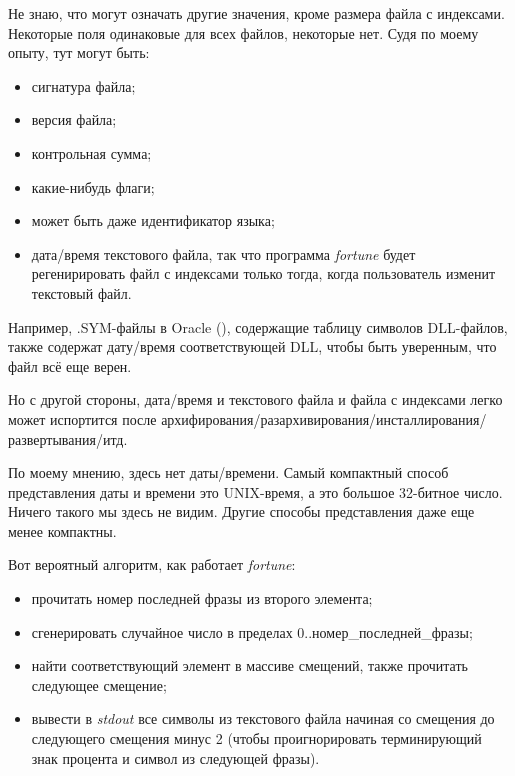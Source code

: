 \begin{figure}[H]
\centering
{}
\end{figure}

Не знаю, что могут означать другие значения, кроме размера файла с индексами.
Некоторые поля одинаковые для всех файлов, некоторые нет.
Судя по моему опыту, тут могут быть:

\begin{itemize}
\item сигнатура файла;
\item версия файла;
\item контрольная сумма;
\item какие-нибудь флаги;
\item может быть даже идентификатор языка;
\item дата/время текстового файла, так что программа \emph{fortune} будет регенирировать файл с индексами только тогда, когда
пользователь изменит текстовый файл.
\end{itemize}

Например, .SYM-файлы в Oracle (), содержащие таблицу символов DLL-файлов,
также содержат дату/время соответствующей DLL, чтобы быть уверенным, что файл всё еще верен.

Но с другой стороны, дата/время и текстового файла и файла с индексами легко может испортится после
архифирования/разархивирования/инсталлирования/развертывания/итд.

По моему мнению, здесь нет даты/времени. Самый компактный способ представления даты и времени это UNIX-время,
а это большое 32-битное число. Ничего такого мы здесь не видим. Другие способы представления даже еще менее компактны.

Вот вероятный алгоритм, как работает \emph{fortune}:

\begin{itemize}
\item прочитать номер последней фразы из второго элемента;
\item сгенерировать случайное число в пределах 0..номер\_последней\_фразы;
\item найти соответствующий элемент в массиве смещений, также прочитать следующее смещение;
\item вывести в \emph{stdout} все символы из текстового файла начиная со смещения до следующего смещения минус 2 (чтобы
проигнорировать терминирующий знак процента и символ из следующей фразы).
\end{itemize}

